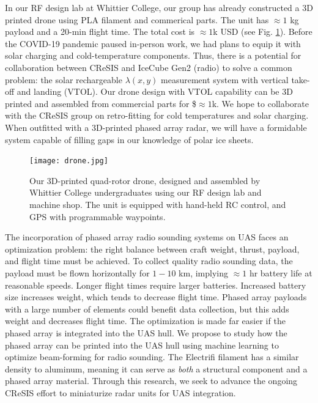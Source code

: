 \documentclass[../../main.tex]{subfiles}
\begin{document}
In our RF design lab at Whittier College, our group has already constructed a 3D printed drone using PLA filament and commerical parts.  The unit has $\approx 1$ kg payload and a 20-min flight time.  The total cost is $\approx 1$k USD (see Fig. \ref{fig:drone}).  Before the COVID-19 pandemic paused in-person work, we had plans to equip it with solar charging and cold-temperature components.  Thus, there is a potential for collaboration between CReSIS and IceCube Gen2 (radio) to solve a common problem: the solar rechargeable $\lambda(x,y)$ measurement system with vertical take-off and landing (VTOL).  Our drone design with VTOL capability can be 3D printed and assembled from commercial parts for \$$\approx1$k.  We hope to collaborate with the CReSIS group on retro-fitting for cold temperatures and solar charging.  When outfitted with a 3D-printed phased array radar, we will have a formidable system capable of filling gaps in our knowledge of polar ice sheets.  \\ \vspace{2.5mm}

\begin{figure}
\centering
\texttt{[image: drone.jpg]}
\caption{\label{fig:drone} Our 3D-printed quad-rotor drone, designed and assembled by Whittier College undergraduates using our RF design lab and machine shop.  The unit is equipped with hand-held RC control, and GPS with programmable waypoints.}
\end{figure}

The incorporation of phased array radio sounding systems on UAS faces an optimization problem: the right balance between craft weight, thrust, payload, and flight time must be achieved.  To collect quality radio sounding data, the payload must be flown horizontally for $1-10$ km, implying $\approx 1$ hr battery life at reasonable speeds.  Longer flight times require larger batteries.  Increased battery size increases weight, which tends to decrease flight time.  Phased array payloads with a large number of elements could benefit data collection, but this adds weight and decreases flight time.  The optimization is made far easier if the phased array is integrated into the UAS hull.  We propose to study how the phased array can be printed into the UAS hull using machine learning to optimize beam-forming for radio sounding.  The Electrifi filament has a similar density to aluminum, meaning it can serve as \textit{both} a structural component and a phased array material.  Through this research, we seek to advance the ongoing CReSIS effort to miniaturize radar units for UAS integration.  \\ \vspace{2.5mm}
\end{document}
